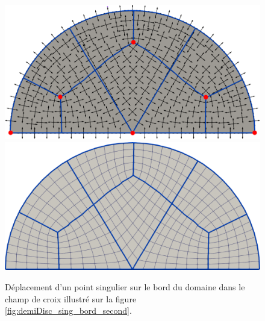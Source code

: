\begin{figure}[!h]
\centering
\includegraphics[scale=0.24]{images/yo_3.pdf}\\[0.5cm]
\includegraphics[scale=0.24]{images/yo_4.pdf}
\caption{Déplacement d'un point singulier sur le bord du domaine dans le champ de croix illustré sur la figure \ref{fig:demiDisc_sing_bord_second}.}
\label{fig:demiDisc_sing_bord_third}
\end{figure}

